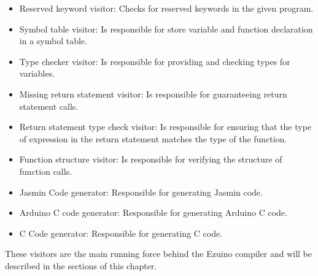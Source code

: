 \begin{itemize}
    \setlength\itemsep{0.3em}
    \item Reserved keyword visitor: Checks for reserved keywords in the given program.
    \item Symbol table visitor: Is responsible for store variable and function declaration in a symbol table.
    \item Type checker visitor: Is responsible for providing and checking types for variables.
    \item Missing return statement visitor: Is responsible for guaranteeing return statement calls.
    \item Return statement type check visitor: Is responsible for ensuring that the type of expression in the return statement matches the type of the function.
    \item Function structure visitor: Is responsible for verifying the structure of function calls.
    \item Jasmin Code generator: Responsible for generating Jasmin code.
    \item Arduino C code generator: Responsible for generating Arduino C code.
    \item C Code generator: Responsible for generating C code.
\end{itemize}
These visitors are the main running force behind the Ezuino compiler and will be described in the sections of this chapter.